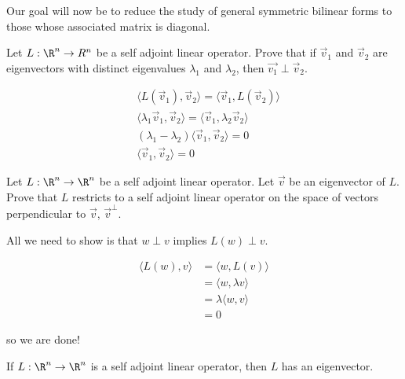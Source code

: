 \documentclass{ximera}
\begin{document}
Our goal will now be to reduce the study of general symmetric bilinear forms to those whose associated matrix is diagonal.

	Let $L: \R^n \to R^n$ be a self adjoint linear operator.  Prove that if $\vec{v}_1$ and $\vec{v}_2$ are eigenvectors with 
	distinct eigenvalues $\lambda_1$  and $\lambda_2$, then $\vec{v_1} \perp \vec{v}_2$.
\begin{free-response}
	\begin{align*}
		&\langle  L(\vec{v}_1), \vec{v}_2 \rangle = \langle \vec{v}_1  ,L(\vec{v}_2)\rangle\\
		&\langle \lambda_1\vec{v}_1, \vec{v}_2\rangle = \langle  \vec{v}_1,\lambda_2 \vec{v}_2\rangle\\
		& (\lambda_1 - \lambda_2)\langle \vec{v}_1,\vec{v}_2\rangle =0\\
		&\langle \vec{v}_1,\vec{v}_2\rangle = 0
	\end{align*}
\end{free-response}

	Let $L:\R^n \to \R^n$ be a self adjoint linear operator.  Let $\vec{v}$ be an eigenvector of $L$.  Prove that $L$ restricts to a self adjoint linear operator
	on the space of vectors perpendicular to $\vec{v}$,  $\vec{v}^\perp$.  

\begin{free-response}
	All we need to show is that $w \perp v$ implies $L(w) \perp v$.
	
	\begin{align*}
		\langle  L(w), v \rangle &= \langle w, L(v)\rangle\\
			&= \langle  w, \lambda v\rangle\\
			&=\lambda \langle w, v \rangle\\
			&=0
	\end{align*}
	
	so we are done!
\end{free-response}

\begin{theorem}
	If $L: \R^n \to \R^n$ is a self adjoint linear operator, then $L$ has an eigenvector.
\end{theorem}
\end{document}
